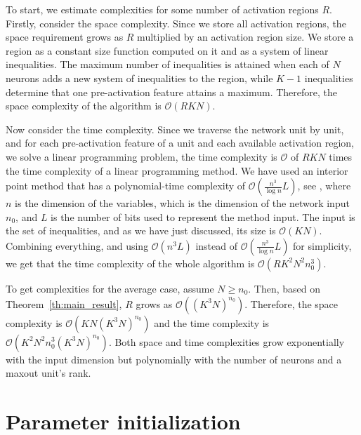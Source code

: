 \documentclass{article}
\theoremstyle{definition}
\newcommand{\nin}{n_0}
\begin{document}
To start, we estimate complexities for some number of activation regions $R$. 
%
Firstly, consider the space complexity.
Since we store all activation regions, the space requirement grows as $R$ multiplied by an activation region size.
We store a region as a constant size function computed on it and as a system of linear inequalities.
The maximum number of inequalities is attained when each of $N$ neurons adds a new system of inequalities to the region, while $K - 1$ inequalities determine that one pre-activation feature attains a maximum.
Therefore, the space complexity of the algorithm is $\mathcal{O} (R K N)$.

Now consider the time complexity.
Since we traverse the network unit by unit, and for each pre-activation feature of a unit and each available activation region, we solve a linear programming problem, the time complexity is $\mathcal{O}$ of $R K N$ times the time complexity of a linear programming method.
We have used an interior point method that has a polynomial-time complexity of $\mathcal{O}(\frac{n^3}{\log n} L)$, see \citet{anstreicher1999linear}, where $n$ is the dimension of the variables, which is the dimension of the network input $\nin$, and $L$ is the number of bits used to represent the method input.
The input is the set of inequalities, and as we have just discussed, its size is $\mathcal{O}(K N)$.
Combining everything, and using $\mathcal{O}(n^3 L)$ instead of $\mathcal{O}(\frac{n^3}{\log n} L)$ for simplicity, we get that the time complexity of the whole algorithm is $\mathcal{O}(R K^2 N^2 \nin^3 )$.

To get complexities for the average case, assume $N \geq \nin$.
Then, based on Theorem~\ref{th:main_result}, $R$ grows as $\mathcal{O}((K^3 N)^{\nin})$.
Therefore, the space complexity is $\mathcal{O} ( K N (K^3 N)^{\nin})$ and the time complexity is $\mathcal{O}( K^2 N^2 \nin^3 (K^3 N)^{\nin})$.
Both space and time complexities grow exponentially with the input dimension but polynomially with the number of neurons and a maxout unit's rank.

\section{Parameter initialization}
\label{app:init}
\end{document}
